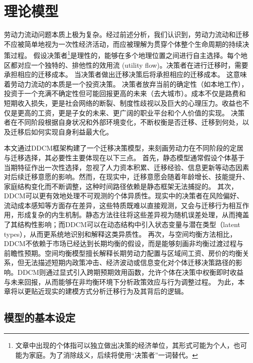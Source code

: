 \documentclass[master, final]{zufe-thesis}
\begin{document}
\chapter{理论模型}

劳动力流动问题本质上极为复杂。经过前述分析，我们认识到，劳动力流动和迁移不应被简单地视为一次性经济活动，而应被理解为贯穿个体整个生命周期的持续决策过程。
假设决策者\footnote{文章中出现的个体指可以独立做出决策的经济单位，其形式可能为个人，也可能为家庭。为了消除歧义，后续将使用“决策者”一词替代。}是理性的，能够在多个地理位置之间进行自主选择。每个地区都对应一个独特的、排他性的效用流 (utility flow)。决策者在进行迁移时，需要承担相应的迁移成本。
当决策者做出迁移决策后将承担相应的迁移成本。
这意味着劳动力流动的本质是一个投资决策。
决策者放弃当前的确定性（如本地工作），投资于一个充满不确定性但可能回报更高的未来（去大城市）。成本不仅是路费和短期收入损失，更是社会网络的断裂、制度性歧视以及巨大的心理压力。收益也不仅是更高的工资，更是子女的未来、更广阔的职业平台和个人价值的实现。
决策者在不同阶段根据自身状况和外部环境变化，不断权衡是否迁移、迁移到何处，以及迁移后如何实现自身利益最大化。

本文通过DDCM框架构建了一个迁移决策模型，来刻画劳动力在不同阶段的定居与迁移选择，其必要性主要体现在以下三点。
首先，静态模型通常假设个体基于当期特征作出一次性选择，忽视了人力资本积累、迁移经验、信息更新等动态因素对后续迁移意愿的影响。然而，在现实中，迁移意愿会随着年龄增长、技能提升、家庭结构变化而不断调整，这种时间路径依赖是静态框架无法捕捉的。  
其次，DDCM可以更有效地处理不可观测的个体异质性。现实中的决策者在风险偏好、流动成本感知等方面存在差异，这些特质既难以直接观测，又会与迁移行为相互作用，形成复杂的内生机制。静态方法往往将这些差异视为随机误差处理，从而掩盖了其结构性影响；而DDCM可以在动态结构中引入状态变量与潜在类型（latent types），从而更系统地识别和解释这类异质性。  
再次，与空间均衡方法相比，DDCM不依赖于市场已经达到长期均衡的假设，而是能够刻画非均衡过渡过程与前瞻性预期。空间均衡模型擅长解释长期劳动力配置与区域间工资、房价的均衡关系，但无法描述短期内政策冲击、经济波动或信息变化对个体迁移决策路径的影响。DDCM则通过显式引入跨期预期效用函数，允许个体在决策中权衡即时收益与未来回报，从而能够在非均衡环境下分析政策效应与行为调整过程。 
为此，本章将以更贴近现实的建模方式分析迁移行为及其背后的逻辑。

\section{模型的基本设定}
\end{document}
